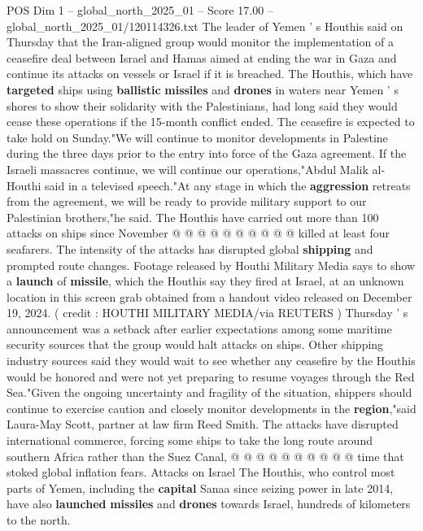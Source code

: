 \begin{textsample}{POS Dim 1 – global\_north\_2025\_01 – Score 17.00 – global\_north\_2025\_01/120114326.txt}  \label{ex:f1_pos_394}
The leader of Yemen ' s Houthis said on Thursday that the Iran-aligned group would monitor the implementation of a ceasefire deal between Israel and Hamas aimed at ending the war in Gaza and continue its attacks on vessels or Israel if it is breached.
The Houthis, which have \textbf{targeted} ships using \textbf{ballistic} \textbf{missiles} and \textbf{drones} in waters near Yemen ' s shores to show their solidarity with the Palestinians, had long said they would cease these operations if the 15-month conflict ended.
The ceasefire is expected to take hold on Sunday."We will continue to monitor developments in Palestine during the three days prior to the entry into force of the Gaza agreement.
If the Israeli massacres continue, we will continue our operations,"Abdul Malik al-Houthi said in a televised speech."At any stage in which the \textbf{aggression} retreats from the agreement, we will be ready to provide military support to our Palestinian brothers,"he said.
The Houthis have carried out more than 100 attacks on ships since November @ @ @ @ @ @ @ @ @ @ killed at least four seafarers.
The intensity of the attacks has disrupted global \textbf{shipping} and prompted route changes.
Footage released by Houthi Military Media says to show a \textbf{launch} of \textbf{missile}, which the Houthis say they fired at Israel, at an unknown location in this screen grab obtained from a handout video released on December 19, 2024. ( credit : HOUTHI MILITARY MEDIA/via REUTERS ) Thursday ' s announcement was a setback after earlier expectations among some maritime security sources that the group would halt attacks on ships.
Other shipping industry sources said they would wait to see whether any ceasefire by the Houthis would be honored and were not yet preparing to resume voyages through the Red Sea."Given the ongoing uncertainty and fragility of the situation, shippers should continue to exercise caution and closely monitor developments in the \textbf{region},"said Laura-May Scott, partner at law firm Reed Smith.
The attacks have disrupted international commerce, forcing some ships to take the long route around southern Africa rather than the Suez Canal, @ @ @ @ @ @ @ @ @ @ time that stoked global inflation fears.
Attacks on Israel The Houthis, who control most parts of Yemen, including the \textbf{capital} Sanaa since seizing power in late 2014, have also \textbf{launched} \textbf{missiles} and \textbf{drones} towards Israel, hundreds of kilometers to the north.

\end{textsample}
